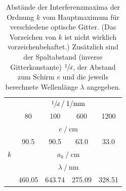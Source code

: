 \begin{table}
  \centering
  \caption{
    Abstände der Interferenzmaxima der Ordnung $k$ vom Hauptmaximum für verschiedene optische Gitter.
    (Das Vorzeichen von $k$ ist nicht wirklich vorzeichenbehaftet.)
    Zusätzlich sind der Spaltabstand (inverse Gitterkonstante) $\sfrac{1}{d}$, der Abstand zum Schirm $e$ und die jeweils berechnete Wellenlänge $\lambda$ angegeben.
  }
  \label{tab:mess_wellenlaenge}
  \begin{tabular}{S S S S S}
  \toprule
  &  \\
  \cmidrule(lr){2-5}
  & 80 & 100 & 600 & 1200 \\
  \midrule

  &  \\
  \cmidrule(lr){2-5}
  & 90.5 & 90.5 & 63.0 & 33.0 \\
  \midrule

  {$k$} &
   \\
  \midrule

  \midrule

  &  \\
  \cmidrule(lr){2-5}
  & 460.05  & 643.74  & 275.09  & 328.51  \\
  \bottomrule
  \end{tabular}
\end{table}
